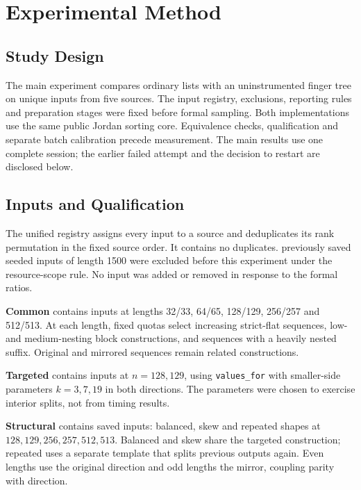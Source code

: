 \chapter{Experimental Method}
\label{chap:methodology}

\section{Study Design}
\label{sec:method-positioning}
\label{sec:method-experiment-stages}
\label{sec:method-scope}

The main experiment compares ordinary lists with an uninstrumented finger
tree on \UnifiedN{} unique inputs from five sources. The input registry,
exclusions, reporting rules and preparation stages were fixed before formal
sampling. Both implementations use the same public Jordan sorting core.
Equivalence checks, qualification and separate batch calibration precede
measurement. The main results use one complete session; the earlier failed
attempt and the decision to restart are disclosed below.

\section{Inputs and Qualification}
\label{sec:method-qualification}

The unified registry assigns every input to a source and deduplicates its
rank permutation in the fixed source order. It contains no duplicates.
\UnifiedExcluded{} previously saved seeded inputs of length 1500 were excluded
before this experiment under the resource-scope rule. No input was added or
removed in response to the formal ratios.

\textbf{Common} contains \UnifiedCommonN{} inputs at lengths 32/33, 64/65,
128/129, 256/257 and 512/513. At each length, fixed quotas select increasing
strict-flat sequences, low- and medium-nesting block constructions, and
sequences with a heavily nested suffix. Original and mirrored sequences
remain related constructions.

\textbf{Targeted} contains \UnifiedTargetedN{} inputs at $n=128,129$, using
\texttt{values\_for} with smaller-side parameters $k=3,7,19$ in both directions.
The parameters were chosen to exercise interior splits, not from timing results.

\label{sec:method-structural-extension}
\textbf{Structural} contains \UnifiedStructuralN{} saved inputs: balanced,
skew and repeated shapes at $128,129,256,257,512,513$. Balanced and skew share
the targeted construction; repeated uses a separate template that splits
previous outputs again. Even lengths use the original direction and odd
lengths the mirror, coupling parity with direction.

